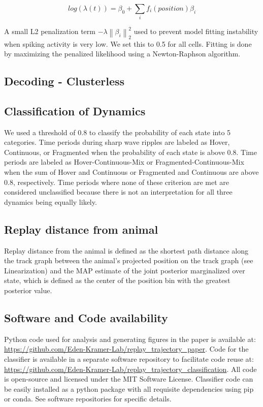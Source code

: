 \documentclass[times, twoside]{zHenriquesLab-StyleBioRxiv}
\newcommand{\norm}[1]{\left\lVert #1 \right\rVert}
\begin{document}
$$log(\lambda(t)) = \beta_{0} + \sum_{i} f_{i}(position)\beta_{i}$$

A small L2 penalization term $-\lambda\norm{\beta_{i}}_{2}^{2}$ used to prevent model fitting instability when spiking activity is very low. We set this to 0.5 for all cells. Fitting is done by maximizing the penalized likelihood using a Newton-Raphson algorithm.

\subsection*{Decoding - Clusterless}

\subsection*{Classification of Dynamics}
We used a threshold of 0.8 to classify the probability of each state into 5 categories. Time periods during sharp wave ripples are labeled as Hover, Continuous, or Fragmented when the probability of each state is above 0.8. Time periods are labeled as Hover-Continuous-Mix or Fragmented-Continuous-Mix when the sum of Hover and Continuous or Fragmented and Continuous are above 0.8, respectively. Time periods where none of these criterion are met are considered unclassified because there is not an interpretation for all three dynamics being equally likely.

\subsection*{Replay distance from animal}
Replay distance from the animal is defined as the shortest path distance along the track graph between the animal's projected position on the track graph (see Linearization) and the MAP estimate of the joint posterior marginalized over state, which is defined as the center of the position bin with the greatest posterior value.

\subsection*{Software and Code availability}
Python code used for analysis and generating figures in the paper is available at: \url{https://github.com/Eden-Kramer-Lab/replay_trajectory_paper}. Code for the classifier is available in a separate software repository to facilitate code reuse at: \url{https://github.com/Eden-Kramer-Lab/replay_trajectory_classification}. All code is open-source and licensed under the MIT Software License. Classifier code can be easily installed as a python package with all requisite dependencies using pip or conda. See software repositories for specific details.
\end{document}
